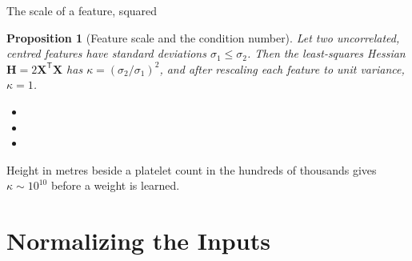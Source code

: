 \documentclass[aspectratio=169, 11pt]{beamer}
\newtheorem{propx}[theorem]{Proposition}
\newcommand{\src}[3]{}      %
\begin{document}
\begin{frame}{The scale of a feature, squared}
  \src{bishop2024}{section}{7.4.1}
  \vspace{-0.25em}
  \begin{propx}[Feature scale and the condition number]\label{th:scale}
    \small
    Let two uncorrelated, centred features have standard deviations
    $\sigma_1 \leq \sigma_2$. Then the least-squares Hessian
    $\mathbf{H} = 2\mathbf{X}^{\mathsf T}\mathbf{X}$ has
    $\kappa = (\sigma_2/\sigma_1)^{2}$, and after rescaling each feature
    to unit variance, $\kappa = 1$.
  \end{propx}
  \vspace{0.05em}
  {\footnotesize
  \begin{itemize}\itemsep0.26em
    \item {}
    \item {}
    \item {}
  \end{itemize}}
  \vspace{-0.35em}
  \begin{redhighlight}
    Height in metres beside a platelet count in the hundreds of
    thousands gives $\kappa \sim 10^{10}$ before a weight is learned.
  \end{redhighlight}
\end{frame}

\section{Normalizing the Inputs}
\end{document}
